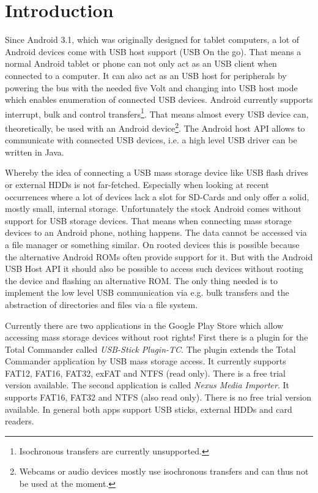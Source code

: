 \chapter{Introduction}
\label{chapter:Introduction}

Since Android 3.1, which was originally designed for tablet computers, a lot of Android devices come with USB host support (USB On the go). That means a normal Android tablet or phone can not only act as an USB client when connected to a computer. It can also act as an USB host for peripherals by powering the bus with the needed five Volt and changing into USB host mode which enables enumeration of connected USB devices\cite{android_usb_host}. Android currently supports interrupt, bulk and control transfers\footnote{Isochronous transfers are currently unsupported\cite{android_usb_constants}.}. That means almost every USB device can, theoretically, be used with an Android device\footnote{Webcams or audio devices mostly use isochronous transfers and can thus not be used at the moment.}. The Android host API allows to communicate with connected USB devices, i.e. a high level USB driver can be written in Java.

Whereby the idea of connecting a USB mass storage device like USB flash drives or external HDDs is not far-fetched. Especially when looking at recent occurrences where a lot of devices lack a slot for SD-Cards and only offer a solid, mostly small, internal storage. Unfortunately the stock Android comes without support for USB storage devices. That means when connecting mass storage devices to an Android phone, nothing happens. The data cannot be accessed via a file manager or something similar. On rooted devices this is possible because the alternative Android ROMs often provide support for it. But with the Android USB Host API it should also be possible to access such devices without rooting the device and flashing an alternative ROM. The only thing needed is to implement the low level USB communication via e.g. bulk transfers and the abstraction of directories and files via a file system.

Currently there are two applications in the Google Play Store which allow accessing mass storage devices without root rights! First there is a plugin for the Total Commander called \textit{USB-Stick Plugin-TC}. The plugin extends the Total Commander application by USB mass storage access. It currently supports FAT12, FAT16, FAT32, exFAT and NTFS (read only). There is a free trial version available. The second application is called \textit{Nexus Media Importer}. It supports FAT16, FAT32 and NTFS (also read only). There is no free trial version available. In general both apps support USB sticks, external HDDs and card readers.

